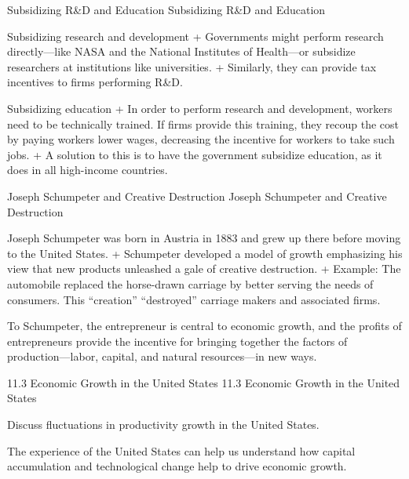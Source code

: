 \documentclass[
  12pt,
  ignorenonframetext,
]{beamer}
\begin{document}
\begin{frame}{Subsidizing R\&D and Education}
\protect\hypertarget{subsidizing-rd-and-education}{}
Subsidizing R\&D and Education

Subsidizing research and development + Governments might perform
research directly---like NASA and the National Institutes of Health---or
subsidize researchers at institutions like universities. + Similarly,
they can provide tax incentives to firms performing R\&D.

Subsidizing education + In order to perform research and development,
workers need to be technically trained. If firms provide this training,
they recoup the cost by paying workers lower wages, decreasing the
incentive for workers to take such jobs. + A solution to this is to have
the government subsidize education, as it does in all high-income
countries.
\end{frame}

\begin{frame}{Joseph Schumpeter and Creative Destruction}
\protect\hypertarget{joseph-schumpeter-and-creative-destruction}{}
Joseph Schumpeter and Creative Destruction

Joseph Schumpeter was born in Austria in 1883 and grew up there before
moving to the United States. + Schumpeter developed a model of growth
emphasizing his view that new products unleashed a gale of creative
destruction. + Example: The automobile replaced the horse-drawn carriage
by better serving the needs of consumers. This ``creation''
``destroyed'' carriage makers and associated firms.

To Schumpeter, the entrepreneur is central to economic growth, and the
profits of entrepreneurs provide the incentive for bringing together the
factors of production---labor, capital, and natural resources---in new
ways.
\end{frame}

\begin{frame}{11.3 Economic Growth in the United States}
\protect\hypertarget{economic-growth-in-the-united-states}{}
11.3 Economic Growth in the United States

Discuss fluctuations in productivity growth in the United States.

The experience of the United States can help us understand how capital
accumulation and technological change help to drive economic growth.
\end{frame}
\end{document}
